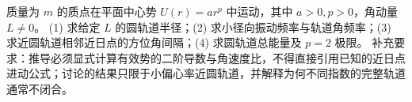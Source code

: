 质量为 \(m\) 的质点在平面中心势 \(U(r)=ar^p\) 中运动，其中 \(a>0,p>0\)，角动量 \(L\ne0\)。
(1) 求给定 \(L\) 的圆轨道半径；(2) 求小径向振动频率与轨道角频率；(3) 求近圆轨道相邻近日点的方位角间隔；(4) 求圆轨道总能量及 \(p=2\) 极限。
补充要求：推导必须显式计算有效势的二阶导数与角速度比，不得直接引用已知的近日点进动公式；讨论的结果只限于小偏心率近圆轨道，并解释为何不同指数的完整轨道通常不闭合。
